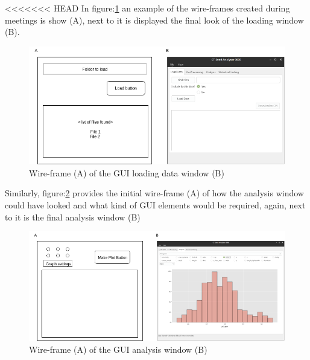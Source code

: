 \documentclass[11pt]{report}
\begin{document}
<<<<<<< HEAD
In figure:\ref{fig:orged34a82} an example of the wire-frames created during meetings is show (A), next to it is displayed the final look of the loading window (B).
\begin{figure}[htbp]
\centering
\includegraphics[width=16cm]{./images/wireframe1.png}
\caption{\label{fig:orged34a82}
Wire-frame (A) of the GUI loading data window (B)}
\end{figure}

Similarly, figure:\ref{fig:orga7ce594} provides the initial wire-frame (A) of how the analysis window could have looked and what kind of GUI elements would be required, again, next to it is the final analysis window (B)
\begin{figure}[htbp]
\centering
\includegraphics[width=16cm]{./images/wireframe2.png}
\caption{\label{fig:orga7ce594}
Wire-frame (A) of the GUI analysis window (B)}
\end{figure}
\end{document}
